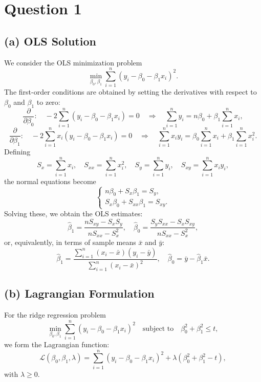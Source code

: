 \documentclass{article}
\begin{document}
\section*{Question 1}

\subsection*{(a) OLS Solution}
We consider the OLS minimization problem
\[
\min_{\beta_0, \beta_1} \sum_{i=1}^n (y_i - \beta_0 - \beta_1 x_i)^2.
\]
The first-order conditions are obtained by setting the derivatives with respect to \(\beta_0\) and \(\beta_1\) to zero:
\[
\frac{\partial}{\partial \beta_0}: \quad -2\sum_{i=1}^n (y_i - \beta_0 - \beta_1 x_i) = 0 
\quad \Longrightarrow \quad \sum_{i=1}^n y_i = n\beta_0 + \beta_1\sum_{i=1}^n x_i,
\]
\[
\frac{\partial}{\partial \beta_1}: \quad -2\sum_{i=1}^n x_i (y_i - \beta_0 - \beta_1 x_i) = 0 
\quad \Longrightarrow \quad \sum_{i=1}^n x_i y_i = \beta_0 \sum_{i=1}^n x_i + \beta_1 \sum_{i=1}^n x_i^2.
\]
Defining
\[
S_x = \sum_{i=1}^n x_i,\quad S_{xx} = \sum_{i=1}^n x_i^2,\quad S_y = \sum_{i=1}^n y_i,\quad S_{xy} = \sum_{i=1}^n x_i y_i,
\]
the normal equations become
\[
\begin{cases}
n \beta_0 + S_x \beta_1 = S_y, \\
S_x \beta_0 + S_{xx} \beta_1 = S_{xy}.
\end{cases}
\]
Solving these, we obtain the OLS estimates:
\[
\boxed{\hat{\beta}_1 = \frac{n S_{xy} - S_x S_y}{n S_{xx} - S_x^2}, \quad \hat{\beta}_0 = \frac{S_y S_{xx} - S_x S_{xy}}{n S_{xx} - S_x^2}},
\]
or, equivalently, in terms of sample means \(\bar{x}\) and \(\bar{y}\):
\[
\boxed{\hat{\beta}_1 = \frac{\sum_{i=1}^n (x_i-\bar{x})(y_i-\bar{y})}{\sum_{i=1}^n (x_i-\bar{x})^2}, \quad \hat{\beta}_0 = \bar{y} - \hat{\beta}_1 \bar{x}}.
\]

\subsection*{(b) Lagrangian Formulation}
For the ridge regression problem
\[
\min_{\beta_0, \beta_1} \sum_{i=1}^n (y_i - \beta_0 - \beta_1 x_i)^2 \quad \text{subject to} \quad \beta_0^2 + \beta_1^2 \le t,
\]
we form the Lagrangian function:
\[
\mathcal{L}(\beta_0, \beta_1, \lambda) = \sum_{i=1}^n (y_i - \beta_0 - \beta_1 x_i)^2 + \lambda \left(\beta_0^2 + \beta_1^2 - t\right),
\]
with \(\lambda \ge 0\).
\end{document}
